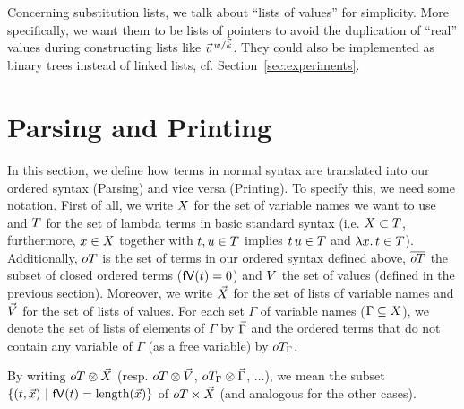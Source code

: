 \documentclass[submission,copyright,creativecommons]{eptcs}
\begin{document}
Concerning substitution lists, we talk about ``lists of values'' for simplicity. More specifically, we want them to be lists of pointers to avoid the duplication of  ``real'' values during constructing lists like $\multiinsert {\vec v} {\vec k} {w}$. They could also be implemented as binary trees instead of linked lists, cf. Section~\ref{sec:experiments}.


\section{Parsing and Printing}
\label{sec:parsing}

In this section, we define how terms in normal syntax are translated into our ordered syntax (Parsing) and vice versa (Printing). 
To specify this, we need some notation. 
First of all, we write $\x$ for the set of variable names we want to use and $\te$ for the set of lambda terms in basic standard syntax (i.e. $\x \subset \te$, furthermore, $x \in \x$ together with $t, u \in \te$ implies $\ApA t u \in \te$ and $\LaA x t \in \te$). Additionally, $\ot$ is the set of terms in our ordered syntax defined above, $\otc$ the subset of closed ordered terms ($\freevars t = 0$) and $\va$ the set of values (defined in the previous section).
Moreover, we write $\xl$ for the set of lists of variable names and $\vl$ for the set of lists of values. 
For each set $\Gamma$ of variable names ($\Gamma \subseteq \x$), we denote the set of lists of elements of $\Gamma$ by $\gl$ and the ordered terms that do not contain any variable of $\Gamma$ (as a free variable) by $\otw$.

By writing $\ot \otimes \xl$ (resp. $\ot \otimes \vl$, $\otw \otimes \gl$, $\ldots$), we mean the subset $\{(t, \vec x) \ | \ \freevars t = \length {\vec x} \}$ of $\ot \times \xl$ (and analogous for the other cases).
\end{document}
